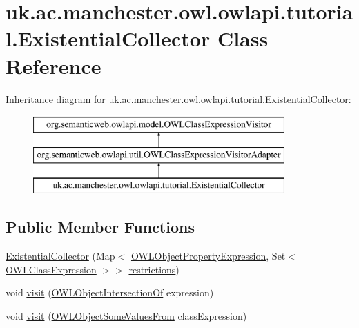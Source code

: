\hypertarget{classuk_1_1ac_1_1manchester_1_1owl_1_1owlapi_1_1tutorial_1_1_existential_collector}{\section{uk.\-ac.\-manchester.\-owl.\-owlapi.\-tutorial.\-Existential\-Collector Class Reference}
\label{classuk_1_1ac_1_1manchester_1_1owl_1_1owlapi_1_1tutorial_1_1_existential_collector}
}
Inheritance diagram for uk.\-ac.\-manchester.\-owl.\-owlapi.\-tutorial.\-Existential\-Collector\-:\begin{figure}[H]
\begin{center}
\leavevmode
\includegraphics[height=3.000000cm]{classuk_1_1ac_1_1manchester_1_1owl_1_1owlapi_1_1tutorial_1_1_existential_collector}
\end{center}
\end{figure}
\subsection*{Public Member Functions}
\begin{DoxyCompactItemize}
\item 
\hyperlink{classuk_1_1ac_1_1manchester_1_1owl_1_1owlapi_1_1tutorial_1_1_existential_collector_a266634e89dea74b411994b3525dd578e}{Existential\-Collector} (Map$<$ \hyperlink{interfaceorg_1_1semanticweb_1_1owlapi_1_1model_1_1_o_w_l_object_property_expression}{O\-W\-L\-Object\-Property\-Expression}, Set$<$ \hyperlink{interfaceorg_1_1semanticweb_1_1owlapi_1_1model_1_1_o_w_l_class_expression}{O\-W\-L\-Class\-Expression} $>$$>$ \hyperlink{classuk_1_1ac_1_1manchester_1_1owl_1_1owlapi_1_1tutorial_1_1_existential_collector_a6cc3fe150efb92cb20431d1279e8f3a3}{restrictions})
\item 
void \hyperlink{classuk_1_1ac_1_1manchester_1_1owl_1_1owlapi_1_1tutorial_1_1_existential_collector_a0eec1fb25bbdc8aa3794f6fbb07a91a8}{visit} (\hyperlink{interfaceorg_1_1semanticweb_1_1owlapi_1_1model_1_1_o_w_l_object_intersection_of}{O\-W\-L\-Object\-Intersection\-Of} expression)
\item 
void \hyperlink{classuk_1_1ac_1_1manchester_1_1owl_1_1owlapi_1_1tutorial_1_1_existential_collector_aaf707c3983cf3d533ae6babdb2c77685}{visit} (\hyperlink{interfaceorg_1_1semanticweb_1_1owlapi_1_1model_1_1_o_w_l_object_some_values_from}{O\-W\-L\-Object\-Some\-Values\-From} class\-Expression)
\end{DoxyCompactItemize}
